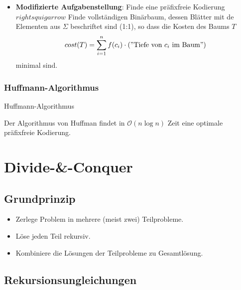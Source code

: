 \documentclass{scrartcl}
\begin{document}
\begin{itemize}
	\item \textbf{Modifizierte Aufgabenstellung}: Finde eine präfixfreie Kodierung $ rightsquigarrow $ Finde vollständigen Binärbaum, dessen Blätter mit de Elementen aus $ \Sigma $ beschriftet sind (1:1), so dass die Kosten des Baums $ T $
	\[ cost(T) = \sum_{i=1}^{n} f(c_i) \cdot (\text{''Tiefe von $ c_i $ im Baum''}) \]
	minimal sind.
\end{itemize}

\subsubsection{Huffmann-Algorithmus}

\begin{algorithm}[H]
	\caption{Huffmann-Algorithmus}
\end{algorithm}

Der Algorithmus von Huffman findet in $ \mathcal{O}(n \log n) $ Zeit eine optimale präfixfreie Kodierung.

\section{Divide-\&-Conquer}

\subsection{Grundprinzip}

\begin{itemize}
	\item Zerlege Problem in mehrere (meist zwei) Teilprobleme.
	\item Löse jeden Teil rekursiv.
	\item Kombiniere die Lösungen der Teilprobleme zu Gesamtlösung.
\end{itemize}

\subsection{Rekursionsungleichungen}
\end{document}
